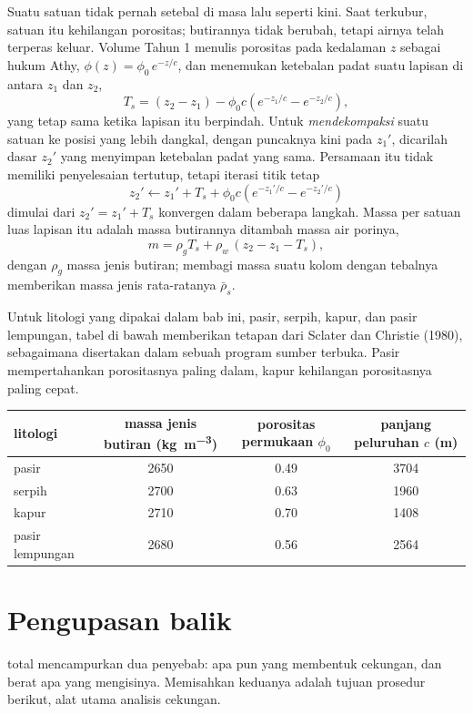 Suatu satuan tidak pernah setebal di masa lalu seperti kini. Saat terkubur, satuan itu kehilangan porositas; butirannya tidak
berubah, tetapi airnya telah terperas keluar. Volume Tahun 1 menulis porositas pada kedalaman
$z$ sebagai hukum Athy, $\phi(z) = \phi_0\,e^{-z/c}$, dan menemukan ketebalan padat suatu lapisan di antara
$z_1$ dan $z_2$,
\[
  T_s = (z_2 - z_1) - \phi_0 c\left(e^{-z_1/c} - e^{-z_2/c}\right),
\]
yang tetap sama ketika lapisan itu berpindah. Untuk \emph{mendekompaksi} suatu satuan ke posisi yang lebih dangkal,
dengan puncaknya kini pada $z_1'$, dicarilah dasar $z_2'$ yang menyimpan ketebalan padat yang sama.
Persamaan itu tidak memiliki penyelesaian tertutup, tetapi iterasi titik tetap
\[
  z_2' \leftarrow z_1' + T_s + \phi_0 c\left(e^{-z_1'/c} - e^{-z_2'/c}\right)
\]
dimulai dari $z_2' = z_1' + T_s$ konvergen dalam beberapa langkah. Massa per satuan luas lapisan itu
adalah massa butirannya ditambah massa air porinya,
\[
  m = \rho_g T_s + \rho_w\,(z_2 - z_1 - T_s),
\]
dengan $\rho_g$ massa jenis butiran; membagi massa suatu kolom dengan tebalnya memberikan
massa jenis rata-ratanya $\bar\rho_s$.

Untuk litologi yang dipakai dalam bab ini, pasir, serpih, kapur, dan pasir lempungan, tabel di bawah
memberikan tetapan dari Sclater dan Christie (1980), sebagaimana disertakan dalam sebuah program sumber terbuka.
Pasir mempertahankan porositasnya paling dalam, kapur kehilangan porositasnya paling cepat.

\begin{center}
\small
\begin{tabular}{lccc}
\hline
litologi & massa jenis butiran (\unit{kg.m^{-3}}) & porositas permukaan $\phi_0$ & panjang peluruhan $c$ (\unit{m}) \\
\hline
pasir & 2650 & 0.49 & 3704 \\
serpih & 2700 & 0.63 & 1960 \\
kapur & 2710 & 0.70 & 1408 \\
pasir lempungan & 2680 & 0.56 & 2564 \\
\hline
\end{tabular}
\end{center}

\section{Pengupasan balik}\label{sec:b2:basins-compared:backstripping}

 total mencampurkan dua penyebab: apa pun yang membentuk cekungan, dan berat apa yang
mengisinya. Memisahkan keduanya adalah tujuan prosedur berikut, alat utama analisis
cekungan.

